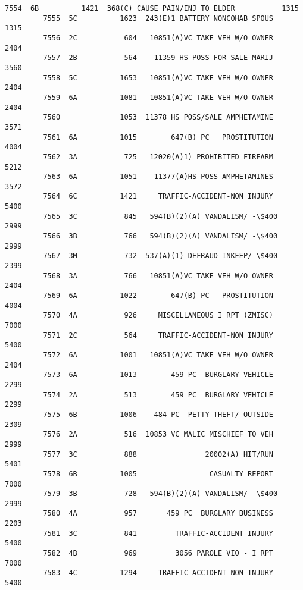 \documentclass[11pt]{article}
\begin{document}
\begin{Verbatim}[commandchars=\\\{\}]
         7554  6B          1421  368(C) CAUSE PAIN/INJ TO ELDER           1315   
         7555  5C          1623  243(E)1 BATTERY NONCOHAB SPOUS           1315   
         7556  2C           604   10851(A)VC TAKE VEH W/O OWNER           2404   
         7557  2B           564    11359 HS POSS FOR SALE MARIJ           3560   
         7558  5C          1653   10851(A)VC TAKE VEH W/O OWNER           2404   
         7559  6A          1081   10851(A)VC TAKE VEH W/O OWNER           2404   
         7560              1053  11378 HS POSS/SALE AMPHETAMINE           3571   
         7561  6A          1015        647(B) PC   PROSTITUTION           4004   
         7562  3A           725   12020(A)1) PROHIBITED FIREARM           5212   
         7563  6A          1051    11377(A)HS POSS AMPHETAMINES           3572   
         7564  6C          1421     TRAFFIC-ACCIDENT-NON INJURY           5400   
         7565  3C           845   594(B)(2)(A) VANDALISM/ -\$400           2999   
         7566  3B           766   594(B)(2)(A) VANDALISM/ -\$400           2999   
         7567  3M           732  537(A)(1) DEFRAUD INKEEP/-\$400           2399   
         7568  3A           766   10851(A)VC TAKE VEH W/O OWNER           2404   
         7569  6A          1022        647(B) PC   PROSTITUTION           4004   
         7570  4A           926     MISCELLANEOUS I RPT (ZMISC)           7000   
         7571  2C           564     TRAFFIC-ACCIDENT-NON INJURY           5400   
         7572  6A          1001   10851(A)VC TAKE VEH W/O OWNER           2404   
         7573  6A          1013        459 PC  BURGLARY VEHICLE           2299   
         7574  2A           513        459 PC  BURGLARY VEHICLE           2299   
         7575  6B          1006    484 PC  PETTY THEFT/ OUTSIDE           2309   
         7576  2A           516  10853 VC MALIC MISCHIEF TO VEH           2999   
         7577  3C           888                20002(A) HIT/RUN           5401   
         7578  6B          1005                 CASUALTY REPORT           7000   
         7579  3B           728   594(B)(2)(A) VANDALISM/ -\$400           2999   
         7580  4A           957       459 PC  BURGLARY BUSINESS           2203   
         7581  3C           841         TRAFFIC-ACCIDENT INJURY           5400   
         7582  4B           969         3056 PAROLE VIO - I RPT           7000   
         7583  4C          1294     TRAFFIC-ACCIDENT-NON INJURY           5400   
         

\end{Verbatim}
\end{document}
